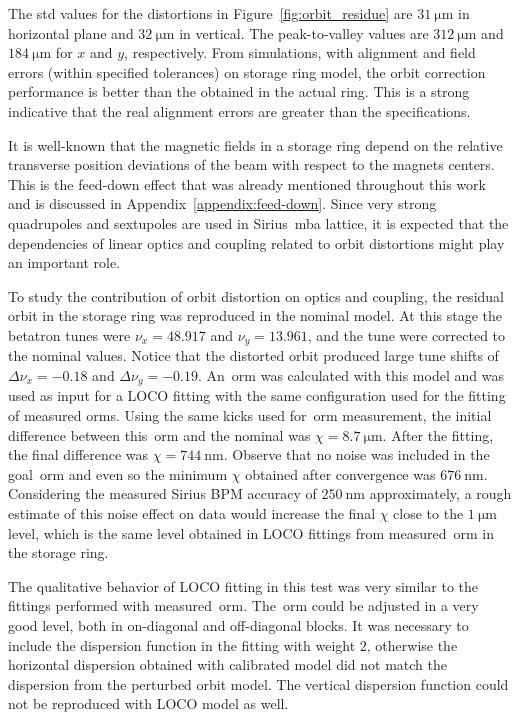 The std values for the distortions in Figure~\ref{fig:orbit_residue} are $\SI{31}{\micro\meter}$ in horizontal plane and $\SI{32}{\micro\meter}$ in vertical. The peak-to-valley values are $\SI{312}{\micro\meter}$ and $\SI{184}{\micro\meter}$ for $x$ and $y$, respectively. From simulations, with alignment and field errors (within specified tolerances) on storage ring model, the orbit correction performance is better than the obtained in the actual ring. This is a strong indicative that the real alignment errors are greater than the specifications.

It is well-known that the magnetic fields in a storage ring depend on the relative transverse position deviations of the beam with respect to the magnets centers. This is the feed-down effect that was already mentioned throughout this work and is discussed in Appendix~\ref{appendix:feed-down}. Since very strong quadrupoles and sextupoles are used in Sirius~\gls{mba} lattice, it is expected that the dependencies of linear optics and coupling related to orbit distortions might play an important role.

To study the contribution of orbit distortion on optics and coupling, the residual orbit in the storage ring was reproduced in the nominal model. At this stage the betatron tunes were $\nu_x = 48.917$ and $\nu_y = 13.961$, and the tune were corrected to the nominal values. Notice that the distorted orbit produced large tune shifts of $\Delta \nu_x = -0.18$ and $\Delta \nu_y = -0.19$. An~\gls{orm} was calculated with this model and was used as input for a LOCO fitting with the same configuration used for the fitting of measured \gls{orm}s. Using the same kicks used for~\gls{orm} measurement, the initial difference between this~\gls{orm} and the nominal was $\chi = \SI{8.7}{\micro\meter}$. After the fitting, the final difference was $\chi = \SI{744}{\nano\meter}$. Observe that no noise was included in the goal~\gls{orm} and even so the minimum $\chi$ obtained after convergence was $\SI{676}{\nano\meter}$. Considering the measured Sirius BPM accuracy of $\SI{250}{\nano\meter}$ approximately, a rough estimate of this noise effect on data would increase the final $\chi$ close to the $\SI{1}{\micro\meter}$ level, which is the same level obtained in LOCO fittings from measured~\gls{orm} in the storage ring.

The qualitative behavior of LOCO fitting in this test was very similar to the fittings performed with measured~\gls{orm}. The~\gls{orm} could be adjusted in a very good level, both in on-diagonal and off-diagonal blocks. It was necessary to include the dispersion function in the fitting with weight $2$, otherwise the horizontal dispersion obtained with calibrated model did not match the dispersion from the perturbed orbit model. The vertical dispersion function could not be reproduced with LOCO model as well. 


